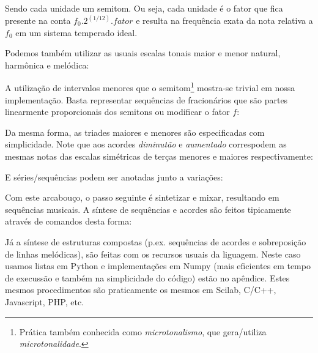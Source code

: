 % 

Sendo cada unidade um semitom. Ou seja, cada unidade é o fator que fica presente na conta $f_0 . 2^{(1/12)} . fator $ e resulta na frequência exata da nota relativa a $f_0$ em um sistema temperado ideal.

Podemos também utilizar as usuais
escalas tonais maior e menor natural, harmônica e melódica:


A utilização de intervalos menores que o semitom\footnote{Prática também conhecida
como \emph{microtonalismo}, que gera/utiliza \emph{microtonalidade}.} mostra-se trivial em
nossa implementação. Basta representar sequências de fracionários
que são partes linearmente proporcionais dos semitons ou modificar o fator $f$:


Da mesma forma, as triades maiores e menores
são especificadas com simplicidade. Note que aos acordes \emph{diminutão} e
\emph{aumentado} correspodem as mesmas notas das escalas simétricas de terças menores
e maiores respectivamente:



E séries/sequências podem ser anotadas junto a variações:


Com este arcabouço, o passo seguinte é sintetizar e mixar, resultando
em sequências musicais. A síntese de sequências e acordes são feitos tipicamente
através de comandos desta forma:


Já a síntese de estruturas compostas (p.ex. sequências de acordes e sobreposição
de linhas melódicas), são feitas com os recursos usuais da liguagem. Neste caso
usamos listas em Python e implementações em Numpy (mais eficientes em tempo de
execussão e também na simplicidade do código) estão no apêndice. Estes mesmos
procedimentos são praticamente os mesmos em Scilab, C/C++, Javascript, PHP, etc.

